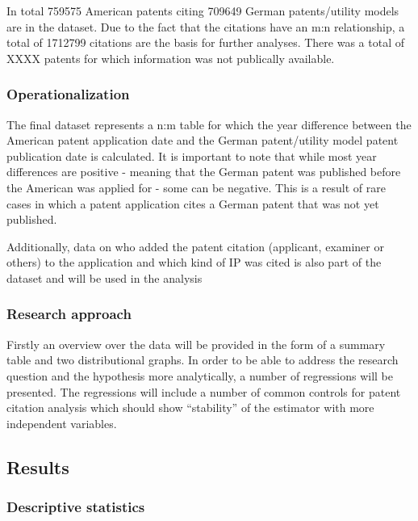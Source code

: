 \documentclass[
  12pt,
]{article}
\begin{document}
In total 759575 American patents citing 709649 German patents/utility
models are in the dataset. Due to the fact that the citations have an
m:n relationship, a total of 1712799 citations are the basis for further
analyses. There was a total of XXXX patents for which information was
not publically available.

\hypertarget{operationalization}{%
\subsubsection{Operationalization}\label{operationalization}}

The final dataset represents a n:m table for which the year difference
between the American patent application date and the German
patent/utility model patent publication date is calculated. It is
important to note that while most year differences are positive -
meaning that the German patent was published before the American was
applied for - some can be negative. This is a result of rare cases in
which a patent application cites a German patent that was not yet
published.

Additionally, data on who added the patent citation (applicant, examiner
or others) to the application and which kind of IP was cited is also
part of the dataset and will be used in the analysis

\hypertarget{research-approach}{%
\subsubsection{Research approach}\label{research-approach}}

Firstly an overview over the data will be provided in the form of a
summary table and two distributional graphs. In order to be able to
address the research question and the hypothesis more analytically, a
number of regressions will be presented. The regressions will include a
number of common controls for patent citation analysis which should show
``stability'' of the estimator with more independent variables.

\hypertarget{results}{%
\subsection{Results}\label{results}}

\hypertarget{descriptive-statistics}{%
\subsubsection{Descriptive statistics}\label{descriptive-statistics}}
\end{document}
